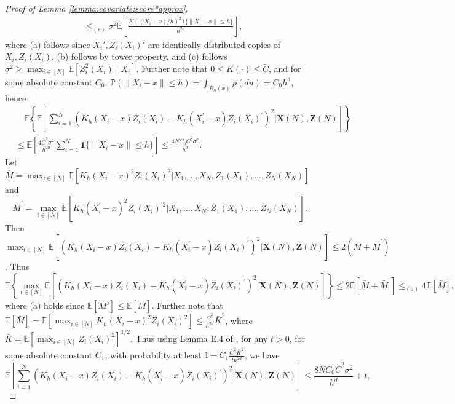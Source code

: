 \documentclass[11pt]{article}
\newcommand{\norm}[1]{\left\lVert #1 \right\rVert}
\begin{document}
\begin{proof}[Proof of Lemma \ref{lemma:covariate:score*approx}]
$$\begin{array}{rl}
&\displaystyle\leq_{(c)}\sigma^2\mathbb{E}\left[\frac{K((X_i-x)/h)^2\mathbf{1}\{\|X_i-x\|\leq h\}}{h^{2d}}\right],
\end{array}$$ 
where (a) follows since $X_i', Z_i(X_i)'$ are identically distributed copies of $X_i,Z_i(X_i)$, (b) follows by tower property, and (c) follows $\sigma^2 \geq \max_{i\in[N]}\mathbb{E}[Z_i^2(X_i) \mid X_i]$. Further note that $0\leq K(\cdot)\leq\bar{C}$, and for some absolute constant $C_0$, $\mathbb{P}(\norm{X_i-x}\leq h)=\int_{B_h(x)}\rho(du)=C_0h^d$, hence
{$$\begin{array}{rl}
&\displaystyle\quad\mathbb{E}\left\{\mathbb{E}\left[\sum_{i=1}^N\left(K_h(X_i-x)Z_i(X_i)-K_h(X_i^\prime-x)Z_i(X_i)^\prime\right)^2\big| \mathbf{X}(N),\mathbf{Z}(N)\right]\right\}\\
&\displaystyle\leq\mathbb{E}\left[\frac{4\bar{C}^2\sigma^2}{h^{2d}}\sum_{i=1}^N\mathbf{1}\{\norm{X_i-x}\leq h\}\right]\leq\frac{4NC_0\bar{C}^2\sigma^2}{h^d}.
\end{array}$$}
Let $\displaystyle\bar{M}=\max_{i\in[N]}\mathbb{E}\left[K_h(X_i-x)^2Z_i(X_i)^2|X_1,\ldots,X_N,Z_1(X_1),\ldots,Z_N(X_N)\right]$ and $$\bar{M}^\prime=\max_{i\in[N]}\mathbb{E}\left[K_h(X_i^\prime-x)^2Z_i(X_i)^{\prime 2}|X_1,\ldots,X_N,Z_1(X_1),\ldots,Z_N(X_N)\right].$$ 
Then $\max_{i\in[N]}\mathbb{E}\left[(K_h(X_i-x)Z_i(X_i)-K_h(X_i^\prime-x)Z_i(X_i)^\prime)^2\big|\mathbf{X}(N),\mathbf{Z}(N)\right]\leq2(\bar{M}+\bar{M}^\prime)$.
Thus 
$$\mathbb{E}\left\{\max_{i\in[N]}\mathbb{E}\left[(K_h(X_i-x)Z_i(X_i)-K_h(X_i^\prime-x)Z_i(X_i)^\prime)^2\big|\mathbf{X}(N),\mathbf{Z}(N)\right]\right\}\leq2\mathbb{E}[\bar{M}+\bar{M}^\prime]\leq_{(a)}4\mathbb{E}[\bar{M}],$$
where (a) holds since $\mathbb{E}[\bar{M}']\leq\mathbb{E}[\bar{M}]$. Further note that $\mathbb{E}[\bar{M}]=\mathbb{E}[\max_{i\in[N]}K_h(X_i-x)^2Z_i(X_i)^2]\leq\frac{\bar{C}^2}{h^{2d}}\bar{K}^2$, where $\bar{K}=\mathbb{E}[\max_{i\in[N]}Z_i(X_i)^2]^{1/2}$. Thus using Lemma E.4 of \citet{chernozhukov2017central}, for any $t>0$, for some absolute constant $C_1$, with probability at least $\displaystyle1-C_1\frac{\bar{C}^2\bar{K}^2}{th^{2d}}$, we have 
$$\mathbb{E}\left[\sum_{i=1}^N\left(K_h(X_i-x)Z_i(X_i)-K_h(X_i^\prime-x)Z_i(X_i)^\prime\right)^2\big| \mathbf{X}(N),\mathbf{Z}(N)\right]\leq\frac{8NC_0\bar{C}^2\sigma^2}{h^d}+t,$$

\end{proof}
\end{document}
